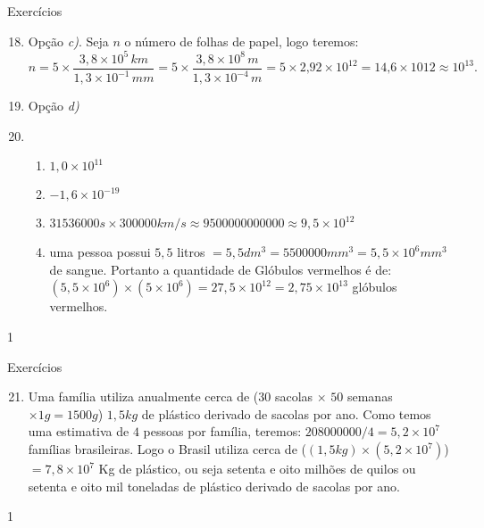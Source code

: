 \begin{answer}{Exercícios}
{\exerciselist
\begin{enumerate}\setcounter{enumi}{17}
\item Opção \textit{c)}. Seja \(n\) o número de folhas de papel, logo teremos: \(n = 5 \times \dfrac{3,8 \times 10^{5}\, km}{1,3 \times 10^{-1}\,mm} = 5 \times \dfrac{3,8 \times 10^{8}\, m}{1,3 \times 10^{-4}\,m}= 5 \times 2\text{,}92 \times 10^{12} = 14\text{,}6 \times 10{12} \approx 10^{13}.\)

\item Opção \textit{d)}

\item 
\begin{enumerate}
\item \(1,0 \times 10^{11}\)

\item \(-1,6 \times 10^{-19}\)

\item \(31536000s \times 300 000 km/s \approx 9 500 000 000 000 \approx 9,5 \times 10^{12}\)

\item uma pessoa possui \(5,5\) litros \(= 5,5 dm^{3} = 5500000 mm^{3} = 5,5 \times 10^{6} mm^{3}\) de sangue. Portanto a quantidade de Glóbulos vermelhos é de: \((5,5 \times 10^{6}) \times (5 \times 10^{6}) = 27,5 \times 10^{12} = 2,75 \times 10^{13}\) glóbulos vermelhos.
\end{enumerate}
\end{enumerate}
}{1}
\end{answer}
\clearmargin

\begin{answer}{Exercícios}
{\exerciselist
\begin{enumerate}\setcounter{enumi}{20}
\item Uma família utiliza anualmente cerca de (\(30\) sacolas \(\times\) \(50\) semanas \(\times 1g = 1500g\)) \(1,5kg\) de plástico derivado de sacolas por ano. Como temos uma estimativa de \(4\) pessoas por família, teremos: \(208000000/4 = 5,2 \times 10^{7}\) famílias brasileiras. Logo o Brasil utiliza cerca de (\((1,5kg) \times (5,2 \times 10^{7})\)) \(= 7,8 \times 10^{7}\) Kg de plástico, ou seja setenta e oito milhões de quilos ou  setenta e oito mil toneladas de plástico derivado de sacolas por ano.
\end{enumerate}
}{1}
\end{answer}


